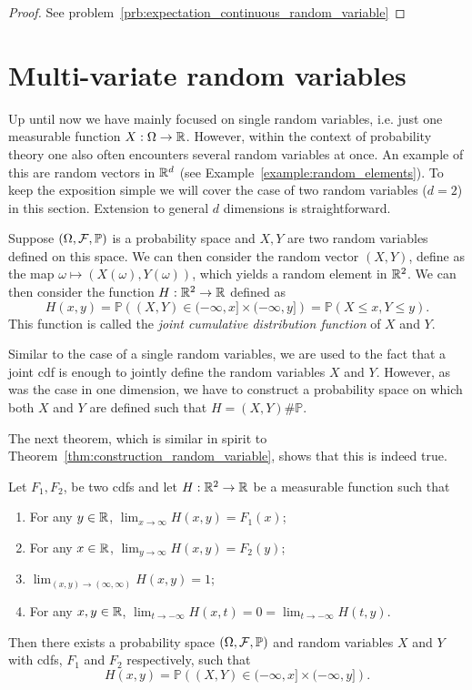\begin{proof}
See problem~\ref{prb:expectation_continuous_random_variable}
\end{proof}

\section{Multi-variate random variables}\label{sec:multi_variate_rvs}

Up until now we have mainly focused on single random variables, i.e. just one measurable function $X : \Omega \to \mathbb R$. However, within the context of probability theory one also often encounters several random variables at once. An example of this are random vectors in $\mathbb R^d$ (see Example~\ref{example:random_elements}). To keep the exposition simple we will cover the case of two random variables ($d = 2$) in this section. Extension to general $d$ dimensions is straightforward. 

Suppose $(\Omega, \mathcal F, \mathbb{P})$ is a probability space and $X, Y$ are two random variables defined on this space. We can then consider the random vector $(X,Y)$, define as the map $\omega \mapsto (X(\omega), Y(\omega))$, which yields a random element in $\mathbb R^2$. We can then consider the function $H : \mathbb R^2 \to \mathbb R$ defined as
\[
	H(x,y) = \mathbb{P}\left((X,Y) \in (-\infty ,x] \times (-\infty, y]\right) = \mathbb{P}(X \le x, Y \le y).
\]
This function is called the \emph{joint cumulative distribution function} of $X$ and $Y$. 

Similar to the case of a single random variables, we are used to the fact that a joint cdf is enough to jointly define the random variables $X$ and $Y$. However, as was the case in one dimension, we have to construct a probability space on which both $X$ and $Y$ are defined such that $H = (X, Y)\# \mathbb{P}$. 


The next theorem, which is similar in spirit to Theorem~\ref{thm:construction_random_variable}, shows that this is indeed true. 

\begin{theorem}\label{thm:construction_multivatiate_rv}
Let $F_1, F_2$, be two cdfs and let $H: \mathbb R^2 \to \mathbb R$ be a measurable function such that
\begin{enumerate}
\item For any $y \in \mathbb R$, $\lim_{x \to \infty} H(x,y) = F_1(x)$; 
\item For any $x \in \mathbb R$, $\lim_{y \to \infty} H(x,y) = F_2(y)$;
\item $\lim_{(x,y) \to (\infty, \infty)} H(x,y) = 1$;
\item For any $x,y \in \mathbb R$, $\lim_{t \to -\infty} H(x,t) = 0 = \lim_{t \to -\infty} H(t,y)$.
\end{enumerate}
Then there exists a probability space $(\Omega, \mathcal F, \mathbb{P})$ and random variables $X$ and $Y$ with cdfs, $F_1$ and $F_2$ respectively, such that
\[
	H(x,y) = \mathbb{P}\left((X,Y) \in (-\infty ,x] \times (-\infty, y]\right).
\]
\end{theorem}

